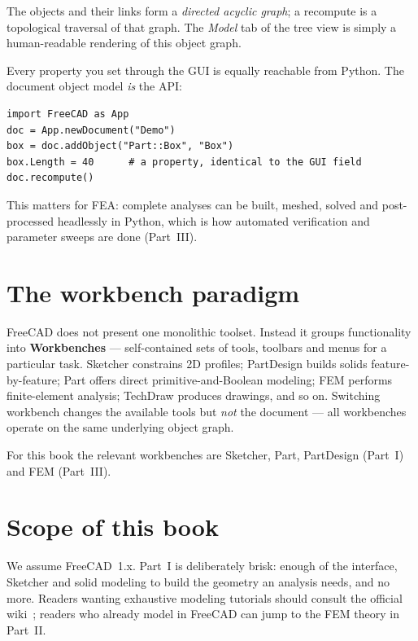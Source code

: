 The objects and their links form a \emph{directed acyclic graph}; a
recompute is a topological traversal of that graph. The \emph{Model} tab
of the tree view is simply a human-readable rendering of this object
graph.

\begin{fctip}
Every property you set through the GUI is equally reachable from Python.
The document object model \emph{is} the API:
\begin{lstlisting}[language=FreeCADPython]
import FreeCAD as App
doc = App.newDocument("Demo")
box = doc.addObject("Part::Box", "Box")
box.Length = 40      # a property, identical to the GUI field
doc.recompute()
\end{lstlisting}
This matters for FEA: complete analyses can be built, meshed, solved and
post-processed headlessly in Python, which is how automated verification
and parameter sweeps are done (Part~III).
\end{fctip}

\section{The workbench paradigm}

FreeCAD does not present one monolithic toolset. Instead it groups
functionality into \textbf{Workbenches} --- self-contained sets of tools,
toolbars and menus for a particular task. \textsf{Sketcher} constrains 2D
profiles; \textsf{PartDesign} builds solids feature-by-feature;
\textsf{Part} offers direct primitive-and-Boolean modeling;
\textsf{FEM} performs finite-element analysis; \textsf{TechDraw}
produces drawings, and so on. Switching workbench changes the available
tools but \emph{not} the document --- all workbenches operate on the same
underlying object graph.

For this book the relevant workbenches are \textsf{Sketcher},
\textsf{Part}, \textsf{PartDesign} (Part~I) and \textsf{FEM}
(Part~III).

\section{Scope of this book}

We assume FreeCAD~1.x. Part~I is deliberately brisk: enough of the
interface, Sketcher and solid modeling to build the geometry an analysis
needs, and no more. Readers wanting exhaustive modeling tutorials should
consult the official wiki~\citep{freecad_wiki}; readers who already model
in FreeCAD can jump to the FEM theory in Part~II.
